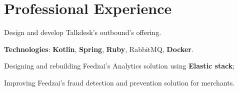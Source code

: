 \documentclass[letterpaper]{deedy-resume} %
\begin{document}
\begin{minipage}[t]{0.64\textwidth} %


\section{Professional Experience}
\vspace{0.5mm}

\vspace{3.5mm}
\begin{tightitemize}
	\item Design and develop Talkdesk's outbound's offering.
\end{tightitemize}

\vspace{0.5mm}

\textbf{Technologies}: \textbf{Kotlin}, \textbf{Spring}, \textbf{Ruby}, RabbitMQ, \textbf{Docker}.


\vspace{4.0mm}



\vspace{2.0mm}
\begin{tightitemize}
	\item Designing and rebuilding Feedzai's Analytics solution using \textbf{Elastic stack};
	\item Improving Feedzai's fraud detection and prevention solution for merchants.
\end{tightitemize}


\end{minipage}
\end{document}
